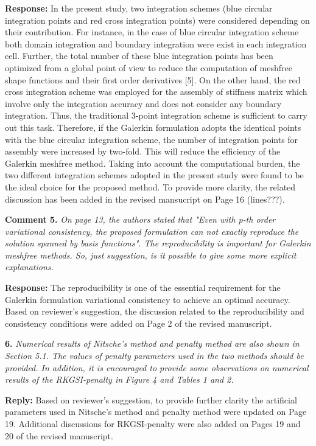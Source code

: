 \documentclass{article}
\begin{document}
\textbf{Response:} In the present study, two integration schemes (blue circular integration points and red cross integration points) were considered depending on their contribution. For instance, in the case of blue circular integration scheme both domain integration and boundary integration were exist in each integration cell. Further, the total number of these blue integration points has been optimized from a global point of view to reduce the computation of meshfree shape functions and their first order derivatives [5]. On the other hand, the red cross integration scheme was employed for the assembly of stiffness matrix which involve only the integration accuracy and does not consider any boundary integration. Thus, the traditional 3-point integration scheme is sufficient to carry out this task. Therefore, if the Galerkin formulation adopts the identical points with the blue circular integration scheme, the number of integration points for assembly were increased by two-fold. This will reduce the efficiency of the Galerkin meshfree method. Taking into account the computational burden, the two different integration schemes adopted in the present study were found to be the ideal choice for the proposed method. To provide more clarity, the related discussion has been added in the revised mansucript on Page 16 (lines???). 

\textbf{Comment 5.} \textit{On page 13, the authors stated that "Even with p-th order variational consistency, the proposed formulation can not exactly reproduce the solution spanned by basis functions". The reproducibility is important for Galerkin meshfree methods. So, just suggestion, is it possible to give some more explicit explanations.}

\textbf{Response:} The reproducibility is one of the essential requirement for the Galerkin formulation variational consistency to achieve an optimal accuracy. Based on reviewer's suggestion, the discussion related to the reproducibility and consistency conditions were added on Page 2 of the revised manuscript.

\textbf{6.} \textit{Numerical results of Nitsche's method and penalty method are also shown in Section 5.1. The values of penalty parameters used in the two methods should be provided. In addition, it is encouraged to provide some observations on numerical results of the RKGSI-penalty in Figure 4 and Tables 1 and 2.}

\textbf{Reply:} Based on reviewer's suggestion, to provide further clarity the artificial parameters used in Nitsche's method and penalty method were updated on Page 19. Additional discussions for RKGSI-penalty were also added on Pages 19 and 20 of the revised manuscript. 
\end{document}
